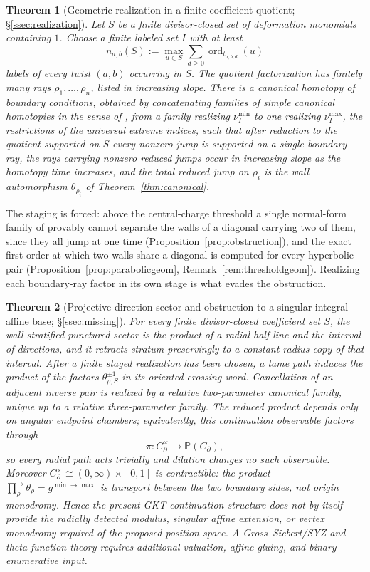 \documentclass[11pt]{amsart}
\newtheorem{theorem}{Theorem}[section]
\theoremstyle{definition}
\theoremstyle{remark}
\begin{document}
\begin{theorem}[Geometric realization in a finite coefficient quotient;
  \S\ref{ssec:realization}]
\label{thm:georealization}
Let $S$ be a finite divisor-closed set of deformation monomials containing
$1$.  Choose a finite labeled set $I$ with at least
\[
n_{a,b}(S):=\max_{u\in S}\sum_{d\ge0}\operatorname{ord}_{t_{a,b,d}}(u)
\]
  labels of every twist $(a,b)$ occurring in $S$.  The quotient factorization has
finitely many rays $\rho_1,\dots,\rho_n$, listed in increasing slope.  There is a
canonical homotopy of boundary conditions, obtained by
concatenating families of simple canonical homotopies in the sense of
\cite[\S3.4]{GKT}, from a family realizing $\nu_I^{\min}$ to one realizing
$\nu_I^{\max}$, the restrictions of the universal extreme indices, such that
after reduction to the quotient supported on $S$ every nonzero
jump is supported on a single boundary ray, the rays carrying
nonzero reduced jumps occur in increasing slope as the homotopy time
increases, and the total reduced jump on $\rho_{i}$ is the wall automorphism
$\theta_{\rho_{i}}$ of Theorem~\ref{thm:canonical}.
\end{theorem}

The staging is forced: above the central-charge threshold a single normal-form
family of \cite[Lem.~3.40]{GKT} provably cannot separate the walls of a
diagonal carrying two of them, since they all jump at one time
(Proposition~\ref{prop:obstruction}), and the exact first order at which two
walls share a diagonal is computed for every hyperbolic pair
(Proposition~\ref{prop:parabolicgeom}, Remark~\ref{rem:thresholdgeom}).
Realizing each boundary-ray factor in its own stage is what evades the
obstruction.

\begin{theorem}[Projective direction sector and obstruction to a singular
  integral-affine base;
  \S\ref{ssec:missing}]
\label{thm:positionobstruction}
For every finite divisor-closed coefficient set $S$, the wall-stratified
punctured sector is the product of a radial half-line and the interval of
directions, and it retracts stratum-preservingly to a constant-radius copy of
that interval.  After a finite staged realization has been chosen, a tame path
induces the product of the factors $\theta_{\rho,S}^{\pm1}$ in its oriented
crossing word.  Cancellation of an adjacent inverse pair is realized by a
relative two-parameter canonical family, unique up to a relative
three-parameter family.  The reduced product depends only on angular endpoint
chambers; equivalently, this continuation observable factors through
\[
 \pi:C_\partial^\times\longrightarrow\mathbb P(C_\partial),
\]
so every radial path acts trivially and dilation changes no such observable.
Moreover
$C_\partial^\times\cong(0,\infty)\times[0,1]$ is contractible: the product
$\prod_\rho^\rightarrow\theta_\rho=g^{\min\to\max}$ is transport between the
two boundary sides, not origin monodromy.  Hence the present GKT continuation
structure does not by itself provide the radially detected modulus, singular
affine extension, or vertex monodromy required of the proposed position space.
A Gross--Siebert/SYZ and theta-function theory requires additional valuation,
affine-gluing, and binary enumerative input.
\end{theorem}
\end{document}
